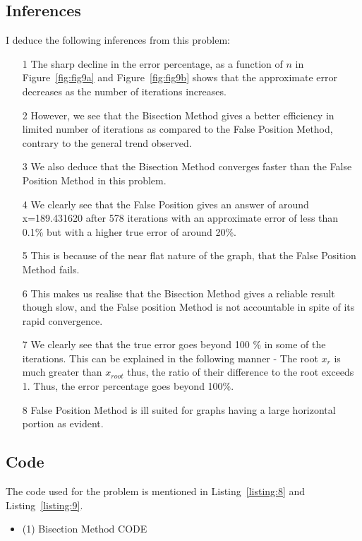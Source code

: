 \documentclass[titlepage, 11pt]{article}
\begin{document}
\subsection{Inferences}
I deduce the following inferences from this problem:
\begin{itemize}
    \item [1] The sharp decline in the error percentage, as a function of $n$ in Figure~\ref{fig:fig9a} and Figure~\ref{fig:fig9b} shows that the approximate error decreases as the number of iterations increases. 
    \item [2] However, we see that the Bisection Method gives a better efficiency in limited number of iterations as compared to the False Position Method, contrary to the general trend observed. 
    \item [3] We also deduce that the Bisection Method converges faster than the False Position Method in this problem.
    \item [4] We clearly see that the False Position gives an answer of around x=189.431620 after 578 iterations with an approximate error of less than 0.1\% but with a higher true error of around 20\%.
    \item [5] This is because of the near flat nature of the graph, that the False Position Method fails. 
    \item [6] This makes us realise that the Bisection Method gives a reliable result though slow, and the False position Method is not accountable in spite of its rapid convergence.  
    \item [7] We clearly see that the true error goes beyond 100 \% in some of the iterations. This can be explained in the following manner - The root $x_r$ is much greater than {$x_{root}$} thus, the ratio of their difference to the root exceeds 1. Thus, the error percentage goes beyond 100\%.
    \item [8] False Position Method is ill suited for graphs having a large horizontal portion as evident.
\end{itemize}


\subsection{Code}
The code used for the problem is mentioned in Listing~\ref{listing:8} and Listing~\ref{listing:9}. 

\begin {itemize}
\item [(1)] Bisection Method CODE
\end {itemize}
\inputminted[breaklines,
 mathescape,
 linenos,
 numbersep=5pt,
 frame=single,
 numbersep=5pt,
 xleftmargin=0pt]{c}{Bisection2.c}
\label{listing:8}
\end{document}
